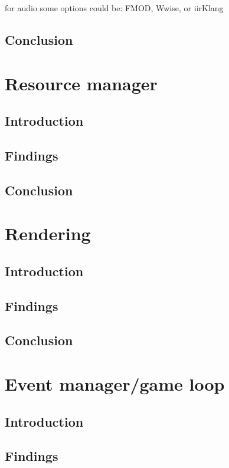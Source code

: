 \documentclass{projdoc}
\begin{document}
for audio some options could be: FMOD, Wwise, or iirKlang

\subsection{Conclusion}

\section{Resource manager}

\subsection{Introduction}

\subsection{Findings}

\subsection{Conclusion}

\section{Rendering}

\subsection{Introduction}

\subsection{Findings}

\subsection{Conclusion}

\section{Event manager/game loop}

\subsection{Introduction}

\subsection{Findings}
\end{document}
